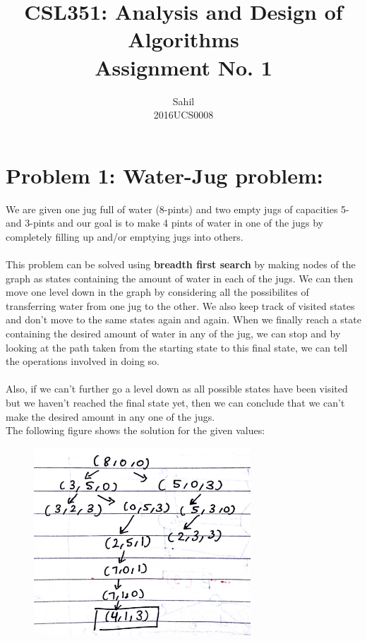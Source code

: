 \documentclass[12pt]{report}
\title{\centering CSL351: Analysis and Design of Algorithms \\Assignment No. 1}
\author{\LARGE Sahil\\2016UCS0008}
\begin{document}
\maketitle

\section{Problem 1: Water-Jug problem:}
We are given one jug full of water (8-pints) and two empty jugs of capacities 5- and 3-pints and our goal is to make 4 pints of water in one of the jugs by completely filling up and/or emptying jugs into others. 
\\ \\ 
This problem can be solved using \textbf{breadth first search} by making nodes of the graph as states containing the amount of water in each of the jugs. We can then move one level down in the graph by considering all the possibilites of transferring water from one jug to the other. We also keep track of visited states and don't move to the same states again and again. When we finally reach a state containing the desired amount of water in any of the jug, we can stop and by looking at the path taken from the starting state to this final state, we can tell the operations involved in doing so. 
\\ \\ 
Also, if we can't further go a level down as all possible states have been visited but we haven't reached the final state yet, then we can conclude that we can't make the desired amount in any one of the jugs.
\\ 
The following figure shows the solution for the given values:
\begin{figure}[H]
	\vspace{0pt}
	\includegraphics[height = 200pt, keepaspectratio]{Snapshots/q1.png}
\end{figure}  
\end{document}
